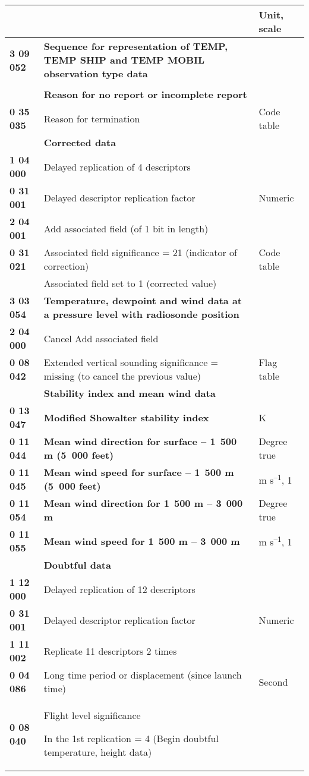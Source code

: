 \begin{longtable}[]{@{}lll@{}}
\toprule
& & Unit, scale\tabularnewline
\midrule
\endhead
\textbf{3 09 052} & \textbf{Sequence for representation of TEMP, TEMP SHIP and TEMP MOBIL observation type data} &\tabularnewline
& &\tabularnewline
& \textbf{Reason for no report or incomplete report} &\tabularnewline
\textbf{0 35 035} & Reason for termination & Code table\tabularnewline
& \textbf{Corrected data} &\tabularnewline
\textbf{1 04 000} & Delayed replication of 4 descriptors &\tabularnewline
\textbf{0 31 001} & Delayed descriptor replication factor & Numeric\tabularnewline
\textbf{2 04 001} & Add associated field (of 1 bit in length) &\tabularnewline
\textbf{0 31 021} & Associated field significance = 21 (indicator of correction) & Code table\tabularnewline
& Associated field set to 1 (corrected value) &\tabularnewline
\textbf{3 03 054} & \textbf{Temperature, dewpoint and wind data at a pressure level with radiosonde position} &\tabularnewline
\textbf{2 04 000} & Cancel Add associated field &\tabularnewline
\textbf{0 08 042} & Extended vertical sounding significance = missing (to cancel the previous value) & Flag table\tabularnewline
& \textbf{Stability index and mean wind data} &\tabularnewline
\textbf{0 13 047} & \textbf{Modified Showalter stability index} & K\tabularnewline
\textbf{0 11 044} & \textbf{Mean wind direction for surface -- 1}~\textbf{500 m (5~000 feet)} & Degree true\tabularnewline
\textbf{0 11 045} & \textbf{Mean wind speed for surface -- 1}~\textbf{500 m (5~000 feet)} & m s\textsuperscript{--1}, 1\tabularnewline
\textbf{0 11 054} & \textbf{Mean wind direction for 1}~\textbf{500 m -- 3}~\textbf{000 m} & Degree true\tabularnewline
\textbf{0 11 055} & \textbf{Mean wind speed for 1}~\textbf{500 m -- 3}~\textbf{000 m} & m s\textsuperscript{--1}, 1\tabularnewline
& \textbf{Doubtful data} &\tabularnewline
\textbf{1 12 000} & Delayed replication of 12 descriptors &\tabularnewline
\textbf{0 31 001} & Delayed descriptor replication factor & Numeric\tabularnewline
\textbf{1 11 002} & Replicate 11 descriptors 2 times &\tabularnewline
\textbf{0 04 086} & Long time period or displacement (since launch time) & Second\tabularnewline
\begin{minipage}[t]{0.30\columnwidth}\raggedright
\textbf{0 08 040}\strut
\end{minipage} & \begin{minipage}[t]{0.30\columnwidth}\raggedright
Flight level significance

In the 1st replication = 4 (Begin doubtful temperature, height data)


\end{minipage}
\end{longtable}
